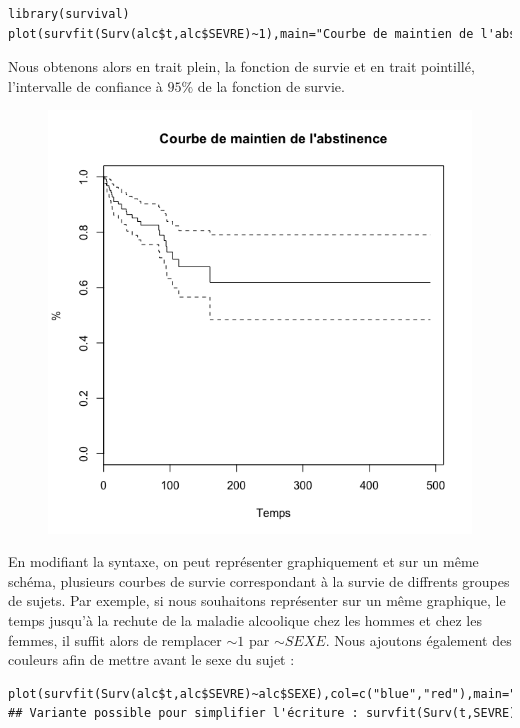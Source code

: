 \begin{lstlisting}[language=html]
library(survival)
plot(survfit(Surv(alc$t,alc$SEVRE)~1),main="Courbe de maintien de l'abstinence",xlab="Temps",ylab = "%")
\end{lstlisting}
Nous obtenons alors en trait plein, la fonction de survie et en trait pointillé, l'intervalle de confiance à $95\%$ de la fonction de survie. 

\begin{figure}[H]\begin{center}\includegraphics[scale=0.5]{ilu/dsurv3.png}\end{center}\end{figure}

En modifiant la syntaxe, on peut représenter graphiquement et sur un même schéma, plusieurs courbes de survie correspondant à la survie de diffrents groupes de sujets. Par exemple, si nous souhaitons représenter sur un même graphique, le temps jusqu'à la rechute de la maladie alcoolique chez les hommes et chez les femmes, il suffit alors de remplacer $\sim 1$ par $\sim SEXE$. Nous ajoutons également des couleurs afin de mettre avant le sexe du sujet : 

\begin{lstlisting}[language=html]
plot(survfit(Surv(alc$t,alc$SEVRE)~alc$SEXE),col=c("blue","red"),main="Courbe de maintien de l'abstinence",xlab="Temps",ylab = "%")
## Variante possible pour simplifier l'écriture : survfit(Surv(t,SEVRE)~SEXE,data=alc)
\end{lstlisting}

